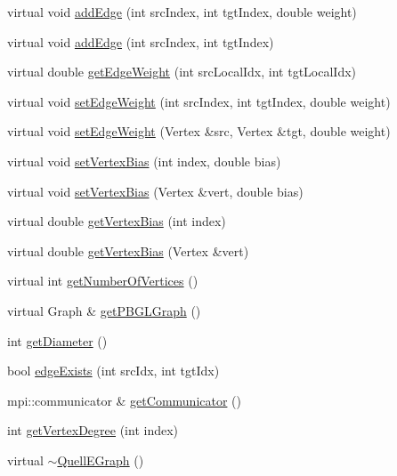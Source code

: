 \begin{DoxyCompactItemize}
\item 
virtual void \hyperlink{a00100_a8bbf5275751043a6fc9b1789a5796399}{add\+Edge} (int src\+Index, int tgt\+Index, double weight)
\item 
virtual void \hyperlink{a00100_afacc841dd74387c1d033029bc895f674}{add\+Edge} (int src\+Index, int tgt\+Index)
\item 
virtual double \hyperlink{a00100_ab6951a05af9c0e381b517a57fbc79b5c}{get\+Edge\+Weight} (int src\+Local\+Idx, int tgt\+Local\+Idx)
\item 
virtual void \hyperlink{a00100_a732628340e77593d26b5d1a6b8ef6e1a}{set\+Edge\+Weight} (int src\+Index, int tgt\+Index, double weight)
\item 
virtual void \hyperlink{a00100_abb3fe8a9c07ce0852ba5956a5b337561}{set\+Edge\+Weight} (Vertex \&src, Vertex \&tgt, double weight)
\item 
virtual void \hyperlink{a00100_a35a4275ddbc78a9dac06db2c1ca43506}{set\+Vertex\+Bias} (int index, double bias)
\item 
virtual void \hyperlink{a00100_a4b33d0531343947e867457c5bff9d222}{set\+Vertex\+Bias} (Vertex \&vert, double bias)
\item 
virtual double \hyperlink{a00100_ae00a3e7e7fd96620663ef6b5a1376515}{get\+Vertex\+Bias} (int index)
\item 
virtual double \hyperlink{a00100_a297058d5e41d7daf0f2ee8963f2a0f72}{get\+Vertex\+Bias} (Vertex \&vert)
\item 
virtual int \hyperlink{a00100_a01ee0f71326e4bac6ff192fb5ea56f89}{get\+Number\+Of\+Vertices} ()
\item 
virtual Graph \& \hyperlink{a00100_a1ab19edb9d268e27f07b40ba1e1b810f}{get\+P\+B\+G\+L\+Graph} ()
\item 
int \hyperlink{a00100_a3654204ef61a7fcefdaee4015fa40812}{get\+Diameter} ()
\item 
bool \hyperlink{a00100_aebf1ab34ca7018f47194a18baf3fac75}{edge\+Exists} (int src\+Idx, int tgt\+Idx)
\item 
mpi\+::communicator \& \hyperlink{a00100_a7f9bcedbc62895ac213b32557cd05e01}{get\+Communicator} ()
\item 
int \hyperlink{a00100_a54c3f8b912c6a177dfda9f8502219650}{get\+Vertex\+Degree} (int index)
\item 
virtual \hyperlink{a00100_a1018911bcafb69cee4d64b562f3bc5a6}{$\sim$\+Quell\+E\+Graph} ()
\end{DoxyCompactItemize}

